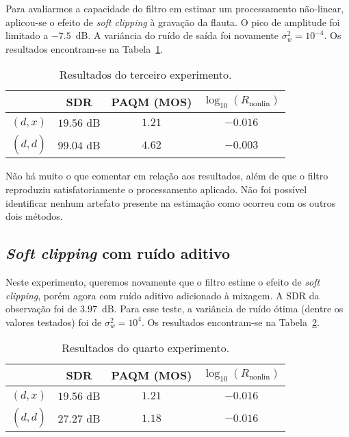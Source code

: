 Para avaliarmos a capacidade do filtro em estimar um processamento não-linear, aplicou-se o efeito de \textit{soft clipping} à gravação da flauta. O pico de amplitude foi limitado a $-7.5$~dB. A variância do ruído de saída foi novamente $\sigma_w^2 = 10^{-4}$. Os resultados encontram-se na Tabela~\ref{tab:unscented:experiment-3}.
{\def\arraystretch{1.25}\tabcolsep=10pt
\begin{table}[!ht]
    \centering
    \caption[Resultados do terceiro experimento: \textit{soft clipping}]{Resultados do terceiro experimento.}
    \label{tab:unscented:experiment-3}
    \begin{tabular}{cccc}
        \toprule
                         & SDR        & PAQM (MOS)   & $\log_{10}(R_{\text{nonlin}})$ \\
        \midrule
        $(d, x)$       & $19.56$ dB & $1.21$  &  $-0.016$               \\
        $(d, \hat{d})$ & $99.04$ dB & $4.62$  &   $-0.003$              \\ \bottomrule
    \end{tabular}
\end{table}
}

Não há muito o que comentar em relação aos resultados, além de que o filtro reproduziu satisfatoriamente o processamento aplicado. Não foi possível identificar nenhum artefato presente na estimação como ocorreu com os outros dois métodos.

\subsection{\textit{Soft clipping} com ruído aditivo}

Neste experimento, queremos novamente que o filtro estime o efeito de \textit{soft clipping}, porém agora com ruído aditivo adicionado à mixagem. A SDR da observação foi de $3.97$~dB. Para esse teste, a variância de ruído ótima (dentre os valores testados) foi de $\sigma_w^2 = 10^{4}$. Os resultados encontram-se na Tabela~\ref{tab:unscented:experiment-4}.
{\def\arraystretch{1.25}\tabcolsep=10pt
\begin{table}[!ht]
    \centering
    \caption[Resultados do quarto experimento: \textit{soft clipping} com ruído aditivo]{Resultados do quarto experimento.}
    \label{tab:unscented:experiment-4}
    \begin{tabular}{cccc}
        \toprule
                         & SDR        & PAQM (MOS)   & $\log_{10}(R_{\text{nonlin}})$ \\
        \midrule
        $(d, x)$       & $19.56$ dB & $1.21$  &  $-0.016$               \\
        $(d, \hat{d})$ & $27.27$ dB & $1.18$  &   $-0.016$              \\ \bottomrule
    \end{tabular}
\end{table}
}

